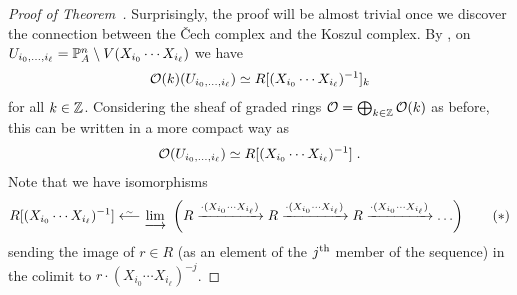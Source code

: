 \documentclass[a4paper,parskip=half,numbers=enddot, DIV=12]{scrreprt}
\newcommand{\vC}{\v{C}}
\begin{document}
\begin{proof}[Proof of Theorem~]
	Surprisingly, the proof will be almost trivial once we discover the connection between the \vC ech complex and the Koszul complex. By , on $U_{i_0,\ldots,i_\ell}= \mathbb{P}_A^n\setminus V(X_{i_0}\cdots X_{i_\ell})$ we have
	\begin{align*}
		\mathcal{O}(k)(U_{i_0,\ldots,i_\ell})\simeq R[(X_{i_0}\cdots X_{i_\ell})^{-1}]_k
	\end{align*}
	for all $k\in \mathbb{Z}$. Considering the sheaf of graded rings $\mathcal{O}=\bigoplus_{k\in\mathbb{Z}}\mathcal{O}(k)$ as before, this can be written in a more compact way as
	\begin{align*}
		\mathcal{O}(U_{i_0,\ldots,i_\ell})\simeq R[(X_{i_0}\cdots X_{i_\ell})^{-1}]\;.
	\end{align*}
	Note that we have isomorphisms
	\begin{align}\lbl{eq:CechKoszulIso1}
			R[(X_{i_0}\cdots X_{i_\ell})^{-1}]\lisomorphism \colimit \left(R\xrightarrow{\cdot(X_{i_0}\cdots X_{i_\ell})}R\xrightarrow{\cdot(X_{i_0}\cdots X_{i_\ell})}R\xrightarrow{\cdot(X_{i_0}\cdots X_{i_\ell})}\ldots\right)\tag{$*$}
	\end{align}
	sending the image of $r\in R$ (as an element of the $j^{\text{th}}$ member of the sequence) in the colimit to $r\cdot (X_{i_0}\cdots X_{i_\ell})^{-j}$.
	

\end{proof}
\end{document}
